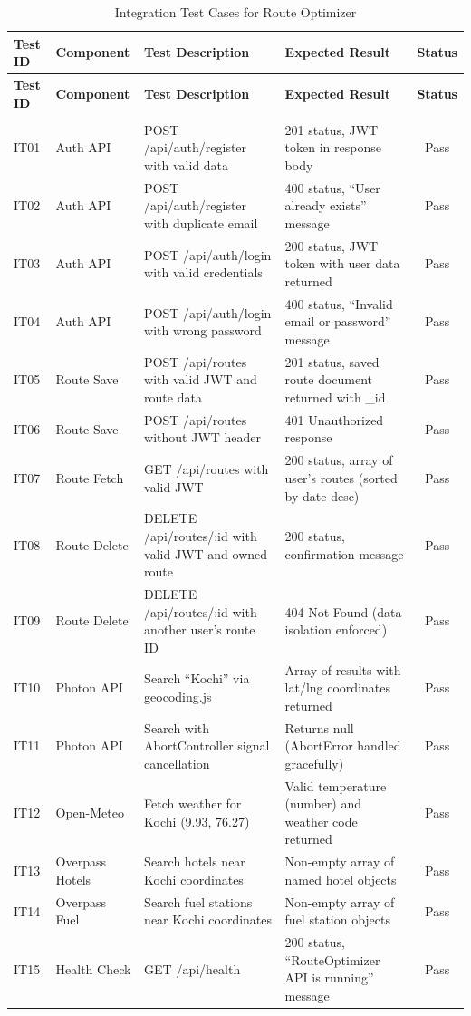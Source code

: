 \begin{longtable}{|p{1.2cm}|p{2.5cm}|p{4cm}|p{4cm}|c|}
    \hline
    \textbf{Test ID} & \textbf{Component} & \textbf{Test Description} & \textbf{Expected Result} & \textbf{Status} \\
    \hline
    \endfirsthead
    \hline
    \textbf{Test ID} & \textbf{Component} & \textbf{Test Description} & \textbf{Expected Result} & \textbf{Status} \\
    \hline
    \endhead
    \hline
    \endfoot
    \hline
    \caption{Integration Test Cases for Route Optimizer} \label{tab:integration_tests} \\
    \endlastfoot

    IT01 & Auth API & POST /api/auth/register with valid data & 201 status, JWT token in response body & Pass \\
    \hline
    IT02 & Auth API & POST /api/auth/register with duplicate email & 400 status, ``User already exists'' message & Pass \\
    \hline
    IT03 & Auth API & POST /api/auth/login with valid credentials & 200 status, JWT token with user data returned & Pass \\
    \hline
    IT04 & Auth API & POST /api/auth/login with wrong password & 400 status, ``Invalid email or password'' message & Pass \\
    \hline
    IT05 & Route Save & POST /api/routes with valid JWT and route data & 201 status, saved route document returned with \_id & Pass \\
    \hline
    IT06 & Route Save & POST /api/routes without JWT header & 401 Unauthorized response & Pass \\
    \hline
    IT07 & Route Fetch & GET /api/routes with valid JWT & 200 status, array of user's routes (sorted by date desc) & Pass \\
    \hline
    IT08 & Route Delete & DELETE /api/routes/:id with valid JWT and owned route & 200 status, confirmation message & Pass \\
    \hline
    IT09 & Route Delete & DELETE /api/routes/:id with another user's route ID & 404 Not Found (data isolation enforced) & Pass \\
    \hline
    IT10 & Photon API & Search ``Kochi'' via geocoding.js & Array of results with lat/lng coordinates returned & Pass \\
    \hline
    IT11 & Photon API & Search with AbortController signal cancellation & Returns null (AbortError handled gracefully) & Pass \\
    \hline
    IT12 & Open-Meteo & Fetch weather for Kochi (9.93, 76.27) & Valid temperature (number) and weather code returned & Pass \\
    \hline
    IT13 & Overpass Hotels & Search hotels near Kochi coordinates & Non-empty array of named hotel objects & Pass \\
    \hline
    IT14 & Overpass Fuel & Search fuel stations near Kochi coordinates & Non-empty array of fuel station objects & Pass \\
    \hline
    IT15 & Health Check & GET /api/health & 200 status, ``RouteOptimizer API is running'' message & Pass \\
    \hline
\end{longtable}

